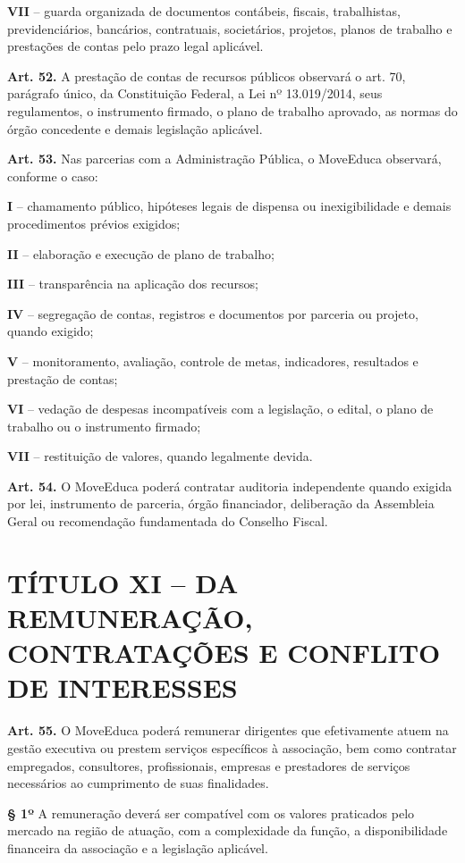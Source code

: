\documentclass[11pt,a4paper]{article}
\begin{document}
\textbf{VII} -- guarda organizada de documentos contábeis, fiscais, trabalhistas, previdenciários, bancários, contratuais, societários, projetos, planos de trabalho e prestações de contas pelo prazo legal aplicável.

\textbf{Art. 52.} A prestação de contas de recursos públicos observará o art. 70, parágrafo único, da Constituição Federal, a Lei nº 13.019/2014, seus regulamentos, o instrumento firmado, o plano de trabalho aprovado, as normas do órgão concedente e demais legislação aplicável.

\textbf{Art. 53.} Nas parcerias com a Administração Pública, o MoveEduca observará, conforme o caso:

\textbf{I} -- chamamento público, hipóteses legais de dispensa ou inexigibilidade e demais procedimentos prévios exigidos;

\textbf{II} -- elaboração e execução de plano de trabalho;

\textbf{III} -- transparência na aplicação dos recursos;

\textbf{IV} -- segregação de contas, registros e documentos por parceria ou projeto, quando exigido;

\textbf{V} -- monitoramento, avaliação, controle de metas, indicadores, resultados e prestação de contas;

\textbf{VI} -- vedação de despesas incompatíveis com a legislação, o edital, o plano de trabalho ou o instrumento firmado;

\textbf{VII} -- restituição de valores, quando legalmente devida.

\textbf{Art. 54.} O MoveEduca poderá contratar auditoria independente quando exigida por lei, instrumento de parceria, órgão financiador, deliberação da Assembleia Geral ou recomendação fundamentada do Conselho Fiscal.

\section*{TÍTULO XI -- DA REMUNERAÇÃO, CONTRATAÇÕES E CONFLITO DE INTERESSES}

\textbf{Art. 55.} O MoveEduca poderá remunerar dirigentes que efetivamente atuem na gestão executiva ou prestem serviços específicos à associação, bem como contratar empregados, consultores, profissionais, empresas e prestadores de serviços necessários ao cumprimento de suas finalidades.

\textbf{§ 1º} A remuneração deverá ser compatível com os valores praticados pelo mercado na região de atuação, com a complexidade da função, a disponibilidade financeira da associação e a legislação aplicável.
\end{document}
